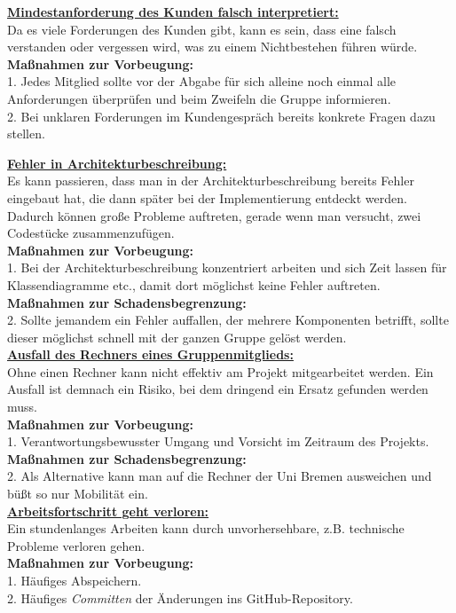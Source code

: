 \documentclass[fontsize=12pt,paper=a4,twoside]{scrartcl}
\begin{document}
\bigskip 

\textbf{\underline{Mindestanforderung des Kunden falsch interpretiert:}}\\
Da es viele Forderungen des Kunden gibt, kann es sein, dass eine falsch verstanden oder vergessen wird, was zu einem Nichtbestehen führen würde.\\
\textbf{Maßnahmen zur Vorbeugung:}\\
1. Jedes Mitglied sollte vor der Abgabe für sich alleine noch einmal alle Anforderungen überprüfen und beim Zweifeln die Gruppe informieren.\\
2. Bei unklaren Forderungen im Kundengespräch bereits konkrete Fragen dazu stellen.\\

\bigskip

\textbf{\underline{Fehler in Architekturbeschreibung:}}\\
Es kann passieren, dass man in der Architekturbeschreibung bereits Fehler eingebaut hat, die dann später bei der Implementierung entdeckt werden. Dadurch können große Probleme auftreten, gerade wenn man versucht, zwei Codestücke zusammenzufügen.\\
\textbf{Maßnahmen zur Vorbeugung:}\\
1. Bei der Architekturbeschreibung konzentriert arbeiten und sich Zeit lassen für Klassendiagramme etc., damit dort möglichst keine Fehler auftreten.\\
\textbf{Maßnahmen zur Schadensbegrenzung:}\\
2. Sollte jemandem ein Fehler auffallen, der mehrere Komponenten betrifft, sollte dieser möglichst schnell mit der ganzen Gruppe gelöst werden.\\ 

\textbf{\underline{Ausfall des Rechners eines Gruppenmitglieds:}}\\
Ohne einen Rechner kann nicht effektiv am Projekt mitgearbeitet werden. Ein Ausfall ist demnach ein Risiko, bei dem dringend ein Ersatz gefunden werden muss.\\
\textbf{Maßnahmen zur Vorbeugung:}\\
1. Verantwortungsbewusster Umgang und Vorsicht im Zeitraum des Projekts.\\
\textbf{Maßnahmen zur Schadensbegrenzung:}\\
2. Als Alternative kann man auf die Rechner der Uni Bremen ausweichen und büßt so nur Mobilität ein.\\ 

\textbf{\underline{Arbeitsfortschritt geht verloren:}}\\
Ein stundenlanges Arbeiten kann durch unvorhersehbare, z.B. technische Probleme verloren gehen.\\
\textbf{Maßnahmen zur Vorbeugung:}\\
1. Häufiges Abspeichern.\\
2. Häufiges \textit{Committen} der Änderungen ins GitHub-Repository.
\end{document}
